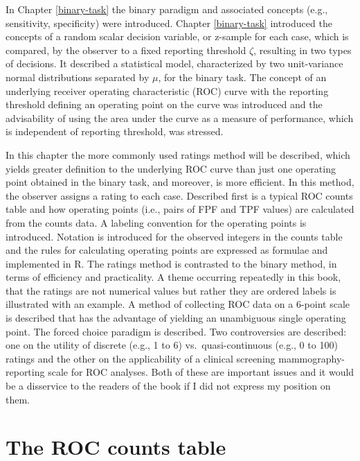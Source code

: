 \documentclass[
]{book}
\begin{document}
In Chapter \ref{binary-task} the binary paradigm and associated concepts (e.g., sensitivity, specificity) were introduced. Chapter \ref{binary-task} introduced the concepts of a random scalar decision variable, or z-sample for each case, which is compared, by the observer to a fixed reporting threshold \(\zeta\), resulting in two types of decisions. It described a statistical model, characterized by two unit-variance normal distributions separated by \(\mu\), for the binary task. The concept of an underlying receiver operating characteristic (ROC) curve with the reporting threshold defining an operating point on the curve was introduced and the advisability of using the area under the curve as a measure of performance, which is independent of reporting threshold, was stressed.

In this chapter the more commonly used ratings method will be described, which yields greater definition to the underlying ROC curve than just one operating point obtained in the binary task, and moreover, is more efficient. In this method, the observer assigns a rating to each case. Described first is a typical ROC counts table and how operating points (i.e., pairs of FPF and TPF values) are calculated from the counts data. A labeling convention for the operating points is introduced. Notation is introduced for the observed integers in the counts table and the rules for calculating operating points are expressed as formulae and implemented in R. The ratings method is contrasted to the binary method, in terms of efficiency and practicality. A theme occurring repeatedly in this book, that the ratings are not numerical values but rather they are ordered labels is illustrated with an example. A method of collecting ROC data on a 6-point scale is described that has the advantage of yielding an unambiguous single operating point. The forced choice paradigm is described. Two controversies are described: one on the utility of discrete (e.g., 1 to 6) vs.~quasi-continuous (e.g., 0 to 100) ratings and the other on the applicability of a clinical screening mammography-reporting scale for ROC analyses. Both of these are important issues and it would be a disservice to the readers of the book if I did not express my position on them.

\hypertarget{ratings-paradigm-roc-counts-table}{%
\section{The ROC counts table}\label{ratings-paradigm-roc-counts-table}}
\end{document}
